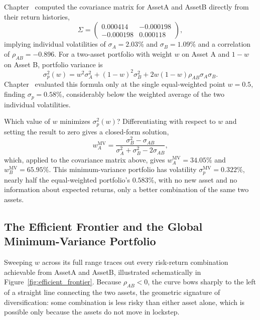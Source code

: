 \documentclass[../ai_in_finance]{subfiles}
\begin{document}
Chapter~ computed the covariance matrix for AssetA and AssetB directly from their return histories,
\begin{equation*}
\Sigma = \begin{pmatrix} 0.000414 & -0.000198 \\ -0.000198 & 0.000118 \end{pmatrix},
\end{equation*}
implying individual volatilities of $\sigma_A = 2.03\%$ and $\sigma_B = 1.09\%$ and a correlation of $\rho_{AB} = -0.896$. For a two-asset portfolio with weight $w$ on Asset A and $1-w$ on Asset B, portfolio variance is
\begin{equation}
\sigma_p^2(w) = w^2 \sigma_A^2 + (1-w)^2 \sigma_B^2 + 2w(1-w)\rho_{AB}\sigma_A\sigma_B.
\label{eq:portfolio-two-asset-variance}
\end{equation}
Chapter~ evaluated this formula only at the single equal-weighted point $w=0.5$, finding $\sigma_p = 0.58\%$, considerably below the weighted average of the two individual volatilities.

Which value of $w$ minimizes $\sigma_p^2(w)$? Differentiating with respect to $w$ and setting the result to zero gives a closed-form solution,
\begin{equation*}
w_A^{\text{MV}} = \frac{\sigma_B^2 - \sigma_{AB}}{\sigma_A^2 + \sigma_B^2 - 2\sigma_{AB}},
\end{equation*}
which, applied to the covariance matrix above, gives $w_A^{\text{MV}} = 34.05\%$ and $w_B^{\text{MV}} = 65.95\%$. This minimum-variance portfolio has volatility $\sigma_p^{\text{MV}} = 0.322\%$, nearly half the equal-weighted portfolio's $0.583\%$, with no new asset and no information about expected returns, only a better combination of the same two assets.

\subsection{The Efficient Frontier and the Global Minimum-Variance Portfolio}
\label{sec:efficient-frontier}

Sweeping $w$ across its full range traces out every risk-return combination achievable from AssetA and AssetB, illustrated schematically in Figure~\ref{fig:efficient_frontier}. Because $\rho_{AB} < 0$, the curve bows sharply to the left of a straight line connecting the two assets, the geometric signature of diversification: some combination is less risky than either asset alone, which is possible only because the assets do not move in lockstep.
\end{document}
